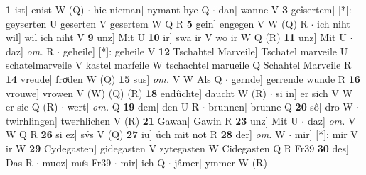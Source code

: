 \documentclass[8pt,a4paper,notitlepage]{article}
\begin{document}
\begin{table}[ht]
\begin{minipage}[t]{0.5\linewidth}
\textbf{1} ist] enist W (Q)  $\cdot$ hie nieman] nymant hye Q  $\cdot$ dan] wanne V \textbf{3} geîsertem] [*]: geyserten U geserten V gesertem W Q R \textbf{5} gein] engegen V W (Q) R  $\cdot$ ich niht wil] wil ich niht V \textbf{9} unz] Mit U \textbf{10} ir] swa ir V wo ir W Q (R) \textbf{11} unz] Mit U  $\cdot$ daz] \textit{om.} R  $\cdot$ geheile] [*]: geheile V \textbf{12} Tschahtel Marveile] Tschatel marveile U schatelmarveile V kastel marfeile W tschachtel marueile Q Schahtel Marveile R \textbf{14} vreude] froͤden W (Q) \textbf{15} sus] \textit{om.} V W Als Q  $\cdot$ gernde] gerrende wunde R \textbf{16} vrouwe] vrowen V (W) (Q) (R) \textbf{18} endûchte] daucht W (R)  $\cdot$ si in] er sich V W er sie Q (R)  $\cdot$ wert] \textit{om.} Q \textbf{19} dem] den U R  $\cdot$ brunnen] brunne Q \textbf{20} sô] dro W  $\cdot$ twirhlingen] twerhlichen V (R) \textbf{21} Gawan] Gawin R \textbf{23} unz] Mit U  $\cdot$ daz] \textit{om.} V W Q R \textbf{26} si ez] sv́s V (Q) \textbf{27} iu] úch mit not R \textbf{28} der] \textit{om.} W  $\cdot$ mir] [*]: mir V ir W \textbf{29} Cydegasten] gidegasten V zytegasten W Cidegasten Q R Fr39 \textbf{30} des] Das R  $\cdot$ muoz] muͦs Fr39  $\cdot$ mir] ich Q  $\cdot$ jâmer] ymmer W (R) \newline
\end{minipage}
\end{table}
\end{document}
